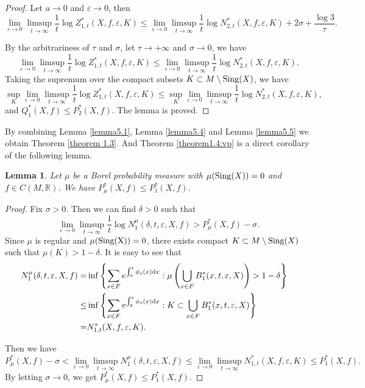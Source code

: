 \documentclass[10pt]{article}
\newtheorem*{Theorem A}{Theorem A}
\newtheorem{Lemma}[Theorem]{Lemma}
\begin{document}
\begin{proof}
\noindent
Let \( a \to 0 \) and \( \varepsilon \to 0 \), then
\[
\lim_{\varepsilon \to 0} \limsup_{t \to \infty} \frac{1}{t} \log Z_{1,t}^*(X, f, \varepsilon, K) \leq \lim_{\varepsilon \to 0}\limsup_{t \to \infty} \frac{1}{t} \log N_{2,t}^*(X, f, \varepsilon, K) + 2\sigma + \frac{\log 3}{\tau}.
\]

\noindent
By the arbitrariness of \( \tau \) and \( \sigma \), let \( \tau \to +\infty \) and \( \sigma \to 0 \), we have
\[
\lim_{\varepsilon \to 0} \limsup_{t \to \infty} \frac{1}{t} \log Z_{1,t}^*(X, f, \varepsilon, K) \leq \lim_{\varepsilon \to 0}\limsup_{t \to \infty} \frac{1}{t} \log N_{2,t}^*(X, f, \varepsilon, K).
\]
Taking the supremum over the compact subsets \( K \subset  M\setminus{\rm Sing}(X)\), we have
\[
\sup_K\lim_{\varepsilon \to 0} \limsup_{t \to \infty} \frac{1}{t} \log Z_{1,t}^*(X, f, \varepsilon, K) \leq\sup_K \lim_{\varepsilon \to 0} \limsup_{t \to \infty} \frac{1}{t} \log N_{2,t}^*(X, f, \varepsilon, K),
\]
and $Q_1^*(X, f)\leq P_2^*(X, f)$. The lemma is proved.
\end{proof}

By combining Lemma \ref{lemma5.1}, Lemma \ref{lemma5.4} and Lemma \ref{lemma5.5} we obtain Theorem \ref{theorem 1.3}. And Theorem \ref{theorem1.4:vp} is a direct corollary of the following lemma.

\begin{Lemma}
Let $\mu$ be a Borel probability measure with $\mu({\rm Sing}(X))=0$ and $f\in C(M, \mathbb{R})$. We have $P_\mu^*(X, f)\leq P_1^*(X, f)$.
\end{Lemma}
\begin{proof}
Fix $\sigma>0$. Then we can find $\delta>0$ such that
$$\lim_{\varepsilon\to 0}\limsup_{t\to\infty}\frac{1}{t}\log N_1^\mu(\delta, t, \varepsilon, X, f)>P_\mu^*(X, f)-\sigma.$$
Since \(\mu\) is regular and $\mu({\rm Sing(X)})=0$, there exists compact \(K\subset M\setminus{\rm Sing}(X)\) such that \(\mu(K)>1-\delta\). It is easy to see that
\[
\begin{aligned}
N_1^\mu(\delta, t, \varepsilon, X, f)
=&\inf\left\{\sum_{x\in F}e^{\int_0^t\phi_s(x){\rm d}x} : \mu\left(\bigcup_{x\in F}B_1^*(x, t, \varepsilon, X)\right)>1-\delta\right\} & \\ \leq&\inf\left\{\sum_{x\in F}e^{\int_0^t\phi_s(x){\rm d}x} : K\subset\bigcup_{x\in F}B_1^*(x, t, \varepsilon, X)\right\}
\\
=&N_{1, t}^*(X, f, \varepsilon, K).
\end{aligned}
\]

Then we have
$$P_\mu^*(X, f)-\sigma<\lim_{\varepsilon\to 0}\limsup_{t\to\infty}N_1^\mu(\delta, t, \varepsilon, X, f)\leq\lim_{\varepsilon\to 0}\limsup_{t\to\infty}N_{1, t}^*(X, f, \varepsilon, K)\leq P_1^*(X, f). $$
By letting $\sigma\to 0$, we get $P_\mu^*(X, f)\leq P_1^*(X, f)$.
\end{proof}
\end{document}
